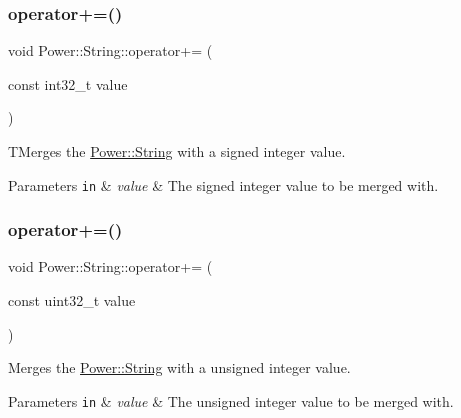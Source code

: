 \subsubsection{\texorpdfstring{operator+=()}{operator+=()}\hspace{0.1cm}{\footnotesize\ttfamily [6/11]}}
{\footnotesize\ttfamily void Power\+::\+String\+::operator+= (\begin{DoxyParamCaption}\item[{const int32\+\_\+t}]{value }\end{DoxyParamCaption})\hspace{0.3cm}{\ttfamily [inline]}}



T\+Merges the \hyperlink{class_power_1_1_string}{Power\+::\+String} with a signed integer value. 


\begin{DoxyParams}[1]{Parameters}
\mbox{\tt in}  & {\em value} & The signed integer value to be merged with. \\
\hline
\end{DoxyParams}
\mbox{\label{class_power_1_1_string_ad2fdb962fe7425c518e9fcc533fb3f55}} 
\subsubsection{\texorpdfstring{operator+=()}{operator+=()}\hspace{0.1cm}{\footnotesize\ttfamily [7/11]}}
{\footnotesize\ttfamily void Power\+::\+String\+::operator+= (\begin{DoxyParamCaption}\item[{const uint32\+\_\+t}]{value }\end{DoxyParamCaption})\hspace{0.3cm}{\ttfamily [inline]}}



Merges the \hyperlink{class_power_1_1_string}{Power\+::\+String} with a unsigned integer value. 


\begin{DoxyParams}[1]{Parameters}
\mbox{\tt in}  & {\em value} & The unsigned integer value to be merged with. \\
\hline
\end{DoxyParams}
\mbox{\label{class_power_1_1_string_a4de514d070a1c7bf464e97f35868e37c}} 
